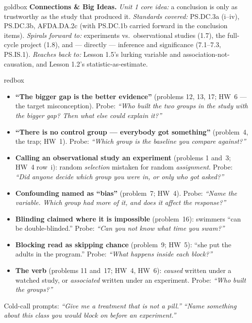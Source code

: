 \documentclass[10pt]{article}
\begin{document}
\begin{skillbox}{goldbox}
\textbf{Connections \& Big Ideas.} \textit{Unit 1 core idea:} a conclusion is only as
trustworthy as the study that produced it. \textit{Standards covered:} PS.DC.3a (i--iv),
PS.DC.3b, AFDA.DA.2c (with PS.DC.1b carried forward in the conclusion items).
\textit{Spirals forward to:} experiments vs.\ observational studies (1.7), the full-cycle
project (1.8), and --- directly --- inference and significance (7.1--7.3, PS.IS.1).
\textit{Reaches back to:} Lesson 1.5's lurking variable and association-not-causation, and
Lesson 1.2's statistic-as-estimate.
\end{skillbox}

\boxguard
\begin{skillbox}{redbox}
\begin{itemize}[leftmargin=1.2em, nosep]
  \item \textbf{``The bigger gap is the better evidence''} (problems 12, 13, 17; HW~6 --- the
        target misconception). Probe: \emph{``Who built the two groups in the study with the
        bigger gap? Then what else could explain it?''}
  \item \textbf{``There is no control group --- everybody got something''} (problem~4, the
        trap; HW~1). Probe: \emph{``Which group is the baseline you compare against?''}
  \item \textbf{Calling an observational study an experiment} (problems 1 and~3; HW~4 row~i):
        random \emph{selection} mistaken for random \emph{assignment}. Probe: \emph{``Did
        anyone decide which group you were in, or only who got asked?''}
  \item \textbf{Confounding named as ``bias''} (problem~7; HW~4). Probe: \emph{``Name the
        variable. Which group had more of it, and does it affect the response?''}
  \item \textbf{Blinding claimed where it is impossible} (problem~16): swimmers ``can be
        double-blinded.'' Probe: \emph{``Can you not know what time you swam?''}
  \item \textbf{Blocking read as skipping chance} (problem~9; HW~5): ``she put the adults in
        the program.'' Probe: \emph{``What happens \emph{inside} each block?''}
  \item \textbf{The verb} (problems 11 and~17; HW~4, HW~6): \emph{caused} written under a
        watched study, or \emph{associated} written under an experiment. Probe: \emph{``Who
        built the groups?''}
\end{itemize}
Cold-call prompts: \emph{``Give me a treatment that is not a pill.''} \quad \emph{``Name
something about this class you would block on before an experiment.''}
\end{skillbox}
\end{document}
